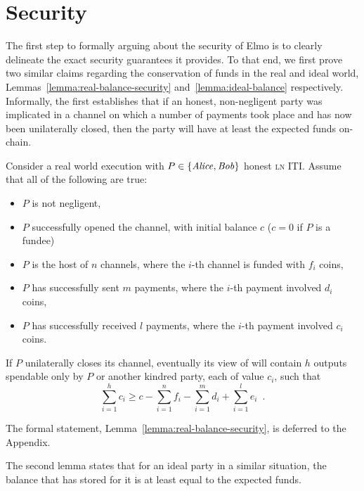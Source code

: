 \section{Security}
  \label{section:security}
  The first step to formally arguing about the security of Elmo is to
  clearly delineate the exact security guarantees it provides. To that end, we
  first prove two similar claims regarding the conservation of funds in the real
  and ideal world, Lemmas~\ref{lemma:real-balance-security}
  and~\ref{lemma:ideal-balance} respectively. Informally, the first establishes
  that if an honest, non-negligent party was implicated in a channel on which a
  number of payments took place and has now been unilaterally closed, then the
  party will have at least the expected funds on-chain.

\begin{lemma}
\label{lemma:real-balance-security-informal}
  Consider a real world execution with $P \in \{\mathit{Alice}, \mathit{Bob}\}$ honest
  \textsc{ln} ITI. Assume that all of the following are true:
  \begin{itemize}
    \item $P$ is not negligent,
    \item $P$ successfully opened the channel, with initial balance $c$ ($c = 0$
    if $P$ is a fundee)
    \item $P$ is the host of $n$ channels, where the $i$-th channel is funded
    with $f_i$ coins,
    \item $P$ has successfully sent $m$ payments, where the $i$-th payment
    involved $d_i$ coins,
    \item $P$ has successfully received $l$ payments, where the $i$-th payment
    involved $c_i$ coins.
  \end{itemize}
  If $P$ unilaterally closes its channel, eventually its view of \ledger will contain $h$
  outputs spendable only by $P$ or another kindred party, each of value $c_i$,
  such that
  \begin{equation}
    \sum\limits_{i=1}^h c_i \geq c - \sum\limits_{i=1}^n f_i -
    \sum\limits_{i=1}^m d_i + \sum\limits_{i=1}^l e_i \enspace.
  \end{equation}
\end{lemma}
The formal statement, Lemma~\ref{lemma:real-balance-security}, is deferred to
the Appendix.


  The second lemma states that for an ideal party in a
  similar situation, the balance that \fchan has stored for it is at least equal
  to the expected funds.

